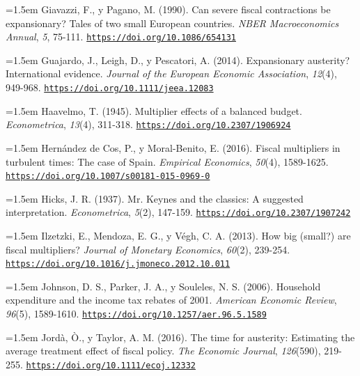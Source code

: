 \documentclass[10pt,a4paper]{article}
\begin{document}
\noindent\hangindent=1.5em Giavazzi, F., y Pagano, M. (1990). Can severe fiscal contractions be expansionary? Tales of two small European countries. \textit{NBER Macroeconomics Annual}, \textit{5}, 75-111. \href{https://doi.org/10.1086/654131}{\nolinkurl{https://doi.org/10.1086/654131}}

\noindent\hangindent=1.5em Guajardo, J., Leigh, D., y Pescatori, A. (2014). Expansionary austerity? International evidence. \textit{Journal of the European Economic Association}, \textit{12}(4), 949-968. \href{https://doi.org/10.1111/jeea.12083}{\nolinkurl{https://doi.org/10.1111/jeea.12083}}

\noindent\hangindent=1.5em Haavelmo, T. (1945). Multiplier effects of a balanced budget. \textit{Econometrica}, \textit{13}(4), 311-318. \href{https://doi.org/10.2307/1906924}{\nolinkurl{https://doi.org/10.2307/1906924}}

\noindent\hangindent=1.5em Hernández de Cos, P., y Moral-Benito, E. (2016). Fiscal multipliers in turbulent times: The case of Spain. \textit{Empirical Economics}, \textit{50}(4), 1589-1625. \href{https://doi.org/10.1007/s00181-015-0969-0}{\nolinkurl{https://doi.org/10.1007/s00181-015-0969-0}}

\noindent\hangindent=1.5em Hicks, J. R. (1937). Mr. Keynes and the classics: A suggested interpretation. \textit{Econometrica}, \textit{5}(2), 147-159. \href{https://doi.org/10.2307/1907242}{\nolinkurl{https://doi.org/10.2307/1907242}}

\noindent\hangindent=1.5em Ilzetzki, E., Mendoza, E. G., y Végh, C. A. (2013). How big (small?) are fiscal multipliers? \textit{Journal of Monetary Economics}, \textit{60}(2), 239-254. \href{https://doi.org/10.1016/j.jmoneco.2012.10.011}{\nolinkurl{https://doi.org/10.1016/j.jmoneco.2012.10.011}}

\noindent\hangindent=1.5em Johnson, D. S., Parker, J. A., y Souleles, N. S. (2006). Household expenditure and the income tax rebates of 2001. \textit{American Economic Review}, \textit{96}(5), 1589-1610. \href{https://doi.org/10.1257/aer.96.5.1589}{\nolinkurl{https://doi.org/10.1257/aer.96.5.1589}}

\noindent\hangindent=1.5em Jordà, Ò., y Taylor, A. M. (2016). The time for austerity: Estimating the average treatment effect of fiscal policy. \textit{The Economic Journal}, \textit{126}(590), 219-255. \href{https://doi.org/10.1111/ecoj.12332}{\nolinkurl{https://doi.org/10.1111/ecoj.12332}}
\end{document}
